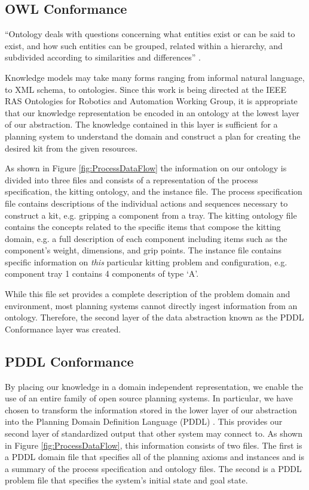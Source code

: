 \documentclass[a4paper, 10pt, conference]{ieeeconf}      %
\begin{document}
\subsection{OWL Conformance}
``Ontology deals with questions concerning what entities exist or can be said to exist, and how such entities can be grouped, related within a hierarchy, and subdivided according to similarities and differences'' \cite{ontologyDef}.

Knowledge models may take many forms ranging from informal natural language, to XML schema, to ontologies. 
Since this work is being directed at the IEEE RAS Ontologies for Robotics and Automation Working Group, it is appropriate that our  knowledge representation be
encoded in an ontology at the lowest layer of our abstraction. The knowledge contained in this layer is sufficient for a planning system to understand the domain and construct
a plan for creating the desired kit from the given resources.

As shown in Figure \ref{fig:ProcessDataFlow} the information on our ontology is divided into three files and consists of a representation of the process specification,
the kitting ontology, and the instance file. The process specification file contains descriptions of
the individual actions and sequences necessary to construct a kit, e.g. gripping a component from a tray. The kitting ontology file contains the concepts related to the specific items 
that compose the kitting domain, e.g. a full description of each component including items such as the component's weight, dimensions, and grip points. The instance file
contains specific information on {\it this} particular kitting problem and configuration, e.g. component tray 1 contains 4 components of type `A'.

While this file set provides a complete description of the problem domain and environment, most planning systems cannot directly ingest information from an ontology.
Therefore, the second layer of the data abstraction known as the PDDL Conformance layer was created.

\subsection{PDDL Conformance}
By placing our knowledge in a domain independent representation, we enable the use of an entire family of open source planning systems. 
In particular, we have chosen to transform the information stored in the lower layer of our abstraction into the Planning Domain Definition Language (PDDL) \cite{PDDL}.
This provides our second layer of standardized output that other system may connect to. As shown in Figure \ref{fig:ProcessDataFlow}, this information consists of two files. The first
is a PDDL domain file that specifies all of the planning axioms and instances and is a summary of the process specification and ontology files. The second is a PDDL problem file that 
specifies the system's initial state and goal state. 
\end{document}
